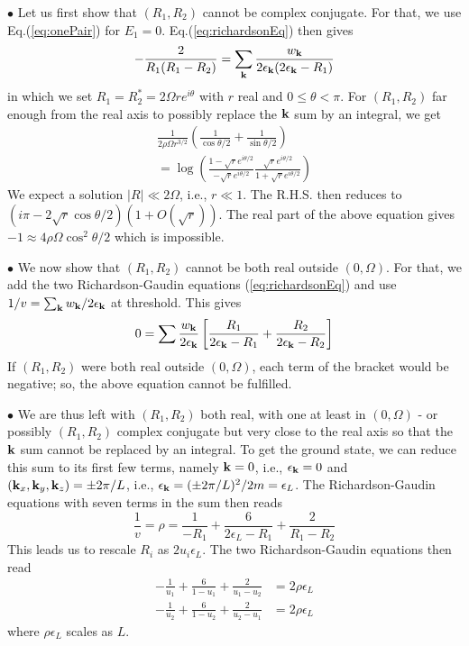 \documentclass[5p,twocolumn]{elsarticle}
\begin{document}
$\bullet$ Let us first show that $(R_1,R_2)$ cannot be complex conjugate. For that, we use Eq.(\ref{eq:onePair}) for $E_1=0$. Eq.(\ref{eq:richardsonEq}) then gives
\begin{equation}
-\frac{2}{R_{1}(R_{1}-R_{2})}=\sum_{\mathbf{k}}\frac{w_{\mathbf{k}}}{2\epsilon_{\mathbf{k}}(2\epsilon_{\mathbf{k}}-R_{1})}
\end{equation}
in which we set $R_1=R^*_2=2 \Omega r e^{i\theta}$ with $r$ real and $0\leqslant\theta<\pi$. For $(R_1,R_2)$ far enough from the real axis to possibly replace the $\mathbf{k}$ sum by an integral, we get
\begin{multline}
\frac{1}{2\rho\Omega{r^{3/2}}}\left(\frac{1}{\cos\theta/2}+\frac{1}{\sin\theta/2}\right)\\
=\log\left(\frac{1-\sqrt{r}e^{i\theta/2}}{-\sqrt{r}e^{i\theta/2}}\frac{\sqrt{r}e^{i\theta/2}}{1+\sqrt{r}e^{i\theta/2}}\right)
\end{multline}
We expect a solution $|R|\ll2 \Omega$, i.e., $r\ll1$. The R.H.S. then reduces to 
$(i\pi-2\sqrt r\cos\theta/2)(1+O(\sqrt r))$. The real part of the above equation gives $-1\approx4 \rho \Omega\cos^2\theta/2$ which is impossible.


$\bullet$ We now show that $(R_1,R_2)$ cannot be both real outside $(0,\Omega)$. For that, we add the two Richardson-Gaudin equations (\ref{eq:richardsonEq}) and use $1/v=\sum_{\mathbf{k}}w_{\mathbf{k}}/2\epsilon_{\mathbf{k}}$ at threshold. This gives
\begin{equation}
0=\sum\frac{w_{\mathbf{k}}}{2\epsilon_{\mathbf{k}}}\left[\frac{R_{1}}{2\epsilon_{\mathbf{k}}-R_{1}}+\frac{R_{2}}{2\epsilon_{\mathbf{k}}-R_{2}}\right]
\end{equation}
If $(R_1,R_2)$ were both real outside $(0,\Omega)$, each term of the bracket would be negative; so, the above equation cannot be fulfilled.


$\bullet$ We are thus left with $(R_1,R_2)$ both real, with one at least in $(0,\Omega)$ - or possibly $(R_1,R_2)$ complex conjugate but very close to the real axis so that the $\mathbf{k}$ sum cannot be replaced by an integral. To get the ground state, we can reduce this sum to its first few terms, namely $\mathbf{k}=0$, i.e., $\epsilon_{\mathbf{k}}=0$ and
 $(\mathbf{k}_x,\mathbf{k}_y,\mathbf{k}_z)=\pm 2\pi/L
 $, i.e., $\epsilon_{\mathbf{k}}=(\pm 2\pi/L)^2/2m=\epsilon_L$. The Richardson-Gaudin equations with seven terms in the sum then reads
\begin{equation}
\frac{1}{v}=\rho=\frac{1}{-R_{1}}+\frac{6}{2\epsilon_{L}-R_{1}}+\frac{2}{R_{1}-R_{2}}
\end{equation}
This leads us to rescale $R_i$ as $2u_i\epsilon_L $. The two Richardson-Gaudin equations then read
\begin{equation}
\begin{split}
-\frac{1}{u_{1}}+\frac{6}{1-u_{1}}+\frac{2}{u_{1}-u_{2}}&=2\rho\epsilon_{L}\\
-\frac{1}{u_{2}}+\frac{6}{1-u_{2}}+\frac{2}{u_{2}-u_{1}}&=2\rho\epsilon_{L}
\end{split}\label{eq:t12}
\end{equation}
where $\rho\epsilon_L$ scales as $L$.
\end{document}
